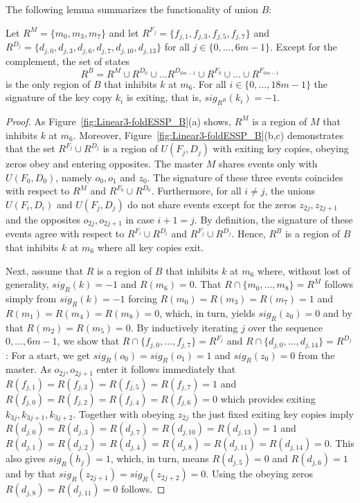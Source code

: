 \documentclass[english]{lipics_hacked}
\begin{document}
%
The following lemma summarizes the functionality of union $B$:
%
\begin{lemma}
\label{lemma:KeyRegionB}
Let $R^{M}=\{m_0,m_3,m_7\}$ and let $R^{F_j}=\{f_{j,1},f_{j,3},f_{j,5},f_{j,7}\}$ and $R^{D_j}=\{d_{j,0},d_{j,3},d_{j,6},d_{j,7},d_{j,10},d_{j,13}\}$ for all $j \in \{0, \dots, 6m-1\}$.
Except for the complement, the set of states 
%
\[R^B = R^M\cup R^{D_0}\cup \dots R^{D_{6m-1}}\cup R^{F_0}\cup \dots \cup R^{F_{6m-1}}\] 
%
is the only region of $B$ that inhibits $k$ at $m_6$.
For all $i \in \{0, \dots, 18m-1\}$ the signature of the key copy $k_i$ is exiting, that is, $sig_{R^B}(k_i) = -1$.
\end{lemma}

\begin{proof}
As Figure~\ref{fig:Linear3-foldESSP_B}(a) shows, $R^M$ is a region of $M$ that inhibits $k$ at $m_6$.
Moreover, Figure~\ref{fig:Linear3-foldESSP_B}(b,c) demonstrates that the set $R^{F_j}\cup R^{D_j}$ is a region of $U(F_j, D_j)$ with exiting key copies, obeying zeros obey and entering opposites.
The master $M$ shares events only with $U(F_0,D_0)$, namely $o_0,o_1$ and $z_0$.
The signature of these three events coincides with respect to $R^{M}$ and $R^{F_0}\cup R^{D_0}$.
Furthermore, for all $i \not= j$, the unions $U(F_i, D_i)$ and $U(F_j, D_j)$ do not share events except for the zeros $z_{2j}, z_{2j+1}$ and the opposites $o_{2j}, o_{2j+1}$ in case $i+1 = j$.
By definition, the signature of these events agree with respect to $R^{F_i}\cup R^{D_i}$ and $R^{F_j}\cup R^{D_j}$.
Hence, $R^B$ is a region of $B$ that inhibits $k$ at $m_6$ where all key copies exit.

Next, assume that $R$ is a region of $B$ that inhibits $k$ at $m_6$ where, without lost of generality, $sig_R(k) = -1$ and $R(m_6)=0$.
That $R \cap \{m_0, \dots, m_8\} = R^{M}$ follows simply from $sig_R(k)=-1$ forcing $R(m_0)=R(m_3)=R(m_7)=1$ and $R(m_1)=R(m_4)=R(m_8)=0$, which, in turn, yields $sig_R(z_0)=0$ and by that $R(m_2)=R(m_5)=0$.
By inductively iterating $j$ over the sequence $0, \dots, 6m-1$, we show that $R\cap \{f_{j,0}, \dots, f_{j,7}\}=R^{F_j}$ and $R\cap \{d_{j,0}, \dots, d_{j,14}\}=R^{D_j}$:
For a start, we get $sig_R(o_0) = sig_R(o_1) = 1$ and $sig_R(z_0) = 0$ from the master.
As $o_{2j}, o_{2j+1}$ enter it follows immediately that $R(f_{j,1})=R(f_{j,3})=R(f_{j,5})=R(f_{j,7})=1$ and $R(f_{j,0})=R(f_{j,2})=R(f_{j,4})=R(f_{j,6})=0$ which provides exiting $k_{3j}, k_{3j+1}, k_{3j+2}$.
Together with obeying $z_{2j}$ the just fixed exiting key copies imply $R(d_{j,0})=R(d_{j,3})=R(d_{j,7})=R(d_{j,10})=R(d_{j,13})=1$ and $R(d_{j,1})=R(d_{j,2})=R(d_{j,4})=R(d_{j,8})=R(d_{j,11})=R(d_{j,14})=0$. This also gives $sig_{R}(h_j)=1$, which, in turn, means $R(d_{j,5})=0$ and $R(d_{j,6})=1$ and by that $sig_{R}(z_{2j+1})=sig_{R}(z_{2j+2})=0$.
Using the obeying zeros $R(d_{j,8})=R(d_{j,11})=0$ follows.
\end{proof}
\end{document}

